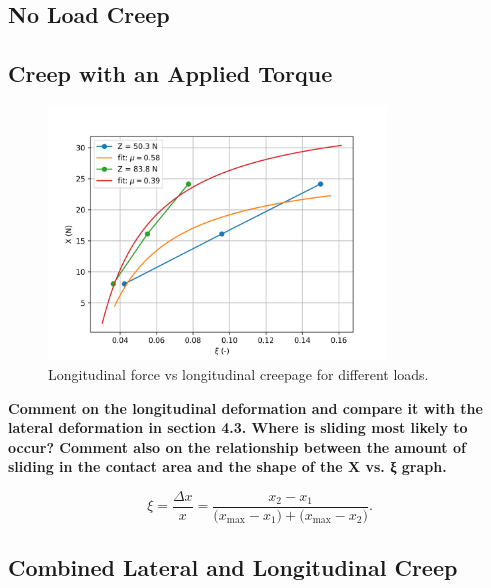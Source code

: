 \documentclass{article}
\begin{document}
\subsection{\textbf{No Load Creep}}

\subsection{\textbf{Creep with an Applied Torque}}

\begin{figure}[H]
    \centering
    \includegraphics[width=0.8\textwidth]{52.png}
    \caption{Longitudinal force vs longitudinal creepage for different loads.}
    \label{fig:longitudinal_force_vs_creepage}
\end{figure}

\begin{center}
    \textbf{ Comment on the longitudinal deformation and compare it with the lateral deformation
    in section 4.3. Where is sliding most likely to occur? Comment also on the
    relationship between the amount of sliding in the contact area and the shape of the X
    vs. ξ graph.}
\end{center}

\begin{equation}
    \xi = \frac{\Delta x}{x} 
     = \frac{x_{2} - x_{1}}
            {\bigl(x_{\max} - x_{1}\bigr) + \bigl(x_{\max} - x_{2}\bigr)}.
\end{equation}

\subsection{\textbf{Combined Lateral and Longitudinal Creep}}
\end{document}
